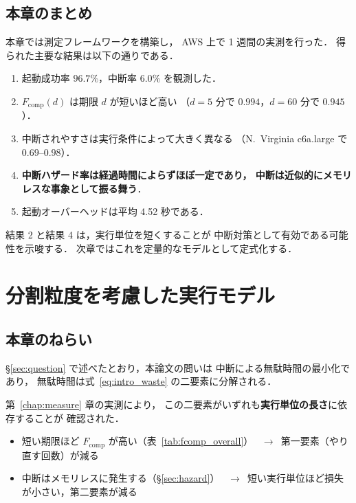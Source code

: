 \documentclass[11pt,a4paper]{ltjsreport}
\newcommand{\Fcomp}{F_{\mathrm{comp}}}
\begin{document}
\section{本章のまとめ}

本章では測定フレームワークを構築し，
AWS 上で 1 週間の実測を行った．
得られた主要な結果は以下の通りである．

\begin{enumerate}
  \item 起動成功率 $96.7\%$，中断率 $6.0\%$ を観測した．
  \item $\Fcomp(d)$ は期限 $d$ が短いほど高い
        （$d=5$ 分で $0.994$，$d=60$ 分で $0.945$）．
  \item 中断されやすさは実行条件によって大きく異なる
        （N.~Virginia c6a.large で $0.69$--$0.98$）．
  \item \textbf{中断ハザード率は経過時間によらずほぼ一定であり，
        中断は近似的にメモリレスな事象として振る舞う}．
  \item 起動オーバーヘッドは平均 4.52 秒である．
\end{enumerate}

結果 2 と結果 4 は，実行単位を短くすることが
中断対策として有効である可能性を示唆する．
次章ではこれを定量的なモデルとして定式化する．

\chapter{分割粒度を考慮した実行モデル}
\label{chap:split}

\section{本章のねらい}

\S\ref{sec:question} で述べたとおり，本論文の問いは
中断による無駄時間の最小化であり，
無駄時間は式~\eqref{eq:intro_waste} の二要素に分解される．

第~\ref{chap:measure} 章の実測により，
この二要素がいずれも\textbf{実行単位の長さ}に依存することが
確認された．

\begin{itemize}
  \item 短い期限ほど $\Fcomp$ が高い（表~\ref{tab:fcomp_overall}）
        \ $\rightarrow$\ 第一要素（やり直す回数）が減る
  \item 中断はメモリレスに発生する（\S\ref{sec:hazard}）
        \ $\rightarrow$\ 短い実行単位ほど損失が小さい，第二要素が減る
\end{itemize}
\end{document}
